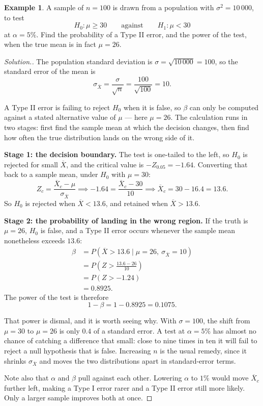 \documentclass[11pt,a4paper]{article}
\theoremstyle{definition}
\newtheorem{example}[thm]{Example}
\newenvironment{solution}
  {\renewcommand{\qedsymbol}{}\begin{proof}[\textit{Solution}.]}
  {\end{proof}}
\begin{document}
\begin{example}
A sample of $n=100$ is drawn from a population with $\sigma^2=10\,000$, to test
\[H_0: \mu \geq 30\qquad \text{against}\qquad H_1:\mu <30\]
at $\alpha=5\%$. Find the probability of a Type II error, and the power of the test, when
the true mean is in fact $\mu=26$.\\
\end{example}

\begin{solution}
The population standard deviation is $\sigma=\sqrt{10\,000}=100$, so the standard error of
the mean is
\[\sigma_{\overline{X}}=\frac{\sigma}{\sqrt{n}}=\frac{100}{\sqrt{100}}=10.\]

A Type II error is failing to reject $H_0$ when it is false, so $\beta$ can only be computed
against a stated alternative value of $\mu$ --- here $\mu=26$. The calculation runs in two
stages: first find the sample mean at which the decision changes, then find how often the
true distribution lands on the wrong side of it.

\textbf{Stage 1: the decision boundary.} The test is one-tailed to the left, so $H_0$ is
rejected for small $\overline{X}$, and the critical value is $-Z_{0.05}=-1.64$. Converting
that back to a sample mean, under $H_0$ with $\mu=30$:
\[Z_c=\frac{\overline{X}_c-\mu}{\sigma_{\overline{X}}}
\implies -1.64=\frac{\overline{X}_c-30}{10}
\implies \overline{X}_c=30-16.4=13.6.\]
So $H_0$ is rejected when $\overline{X}<13.6$, and retained when $\overline{X}>13.6$.

\textbf{Stage 2: the probability of landing in the wrong region.} If the truth is $\mu=26$,
$H_0$ is false, and a Type II error occurs whenever the sample mean nonetheless exceeds
$13.6$:
\begin{align*}
\beta &=P(\overline{X}>13.6 \mid \mu=26,\ \sigma_{\overline{X}}=10)\\
      &=P\!\left(Z>\frac{13.6-26}{10}\right)\\
      &=P(Z>-1.24)\\
      &=0.8925.
\end{align*}
The power of the test is therefore
\[1-\beta=1-0.8925=0.1075.\]

That power is dismal, and it is worth seeing why. With $\sigma=100$, the shift from $\mu=30$
to $\mu=26$ is only $0.4$ of a standard error. A test at $\alpha=5\%$ has almost no chance of
catching a difference that small: close to nine times in ten it will fail to reject a null
hypothesis that is false. Increasing $n$ is the usual remedy, since it shrinks
$\sigma_{\overline{X}}$ and moves the two distributions apart in standard-error terms.

Note also that $\alpha$ and $\beta$ pull against each other. Lowering $\alpha$ to $1\%$ would
move $\overline{X}_c$ further left, making a Type I error rarer and a Type II error still more
likely. Only a larger sample improves both at once.
\end{solution}
\end{document}
